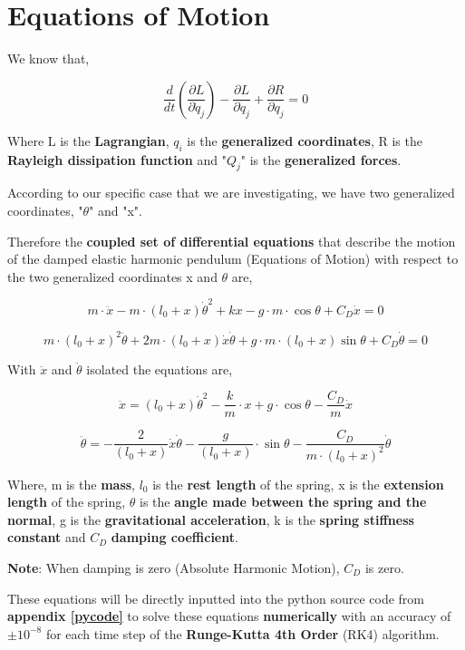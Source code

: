 
\section{{Equations of Motion}}
            
    {We know that,}
            
        $$\frac{d}{dt}\left(\frac{\partial L}{\partial \dot{q}_j}\right) - \frac{\partial L}{\partial q_j} + \frac{\partial R}{\partial q_j} = 0$$
            
    {Where L is the \textbf{Lagrangian}, $q_i$ is the \textbf{generalized coordinates}, R is the \textbf{Rayleigh dissipation function} and "$Q_j$" is the \textbf{generalized forces}.}
            
    {According to our specific case that we are investigating, we have two generalized coordinates, "$\theta$" and "x".}        
            
    {Therefore the \textbf{coupled set of differential equations} that describe the motion of the damped elastic harmonic pendulum (Equations of Motion) with respect to the two generalized coordinates x and $\theta$ are,}
            
        $$m\cdot\ddot{x} -m\cdot(l_0+x)\dot{\theta}^2 + kx - g\cdot m\cdot\cos{\theta} + C_D\dot{x} = 0$$
            
        $$m\cdot(l_0+x)^2\ddot{\theta} + 2m\cdot(l_0+x)\dot{x}\dot{\theta} + g\cdot m\cdot(l_0+x)\sin{\theta} + C_D\dot{\theta} = 0$$
            
    {With $\ddot{x}$ and $\ddot{\theta}$ isolated the equations are,}
            
        $$\ddot{x} = (l_0+x)\dot{\theta}^2 - \frac{k}{m}\cdot x + g\cdot\cos{\theta} - \frac{C_D}{m}\dot{x}$$
            
        $$\ddot{\theta} = - \frac{2}{(l_0+x)}\dot{x}\dot{\theta} - \frac{g}{(l_0+x)}\cdot\sin{\theta} - \frac{C_D}{m\cdot(l_0+x)^2}\dot{\theta}$$
            
    {Where, m is the \textbf{mass}, $l_0$ is the \textbf{rest length} of the spring, x is the \textbf{extension length} of the spring, $\theta$ is the \textbf{angle made between the spring and the normal}, g is the \textbf{gravitational acceleration}, k is the \textbf{spring stiffness constant} and $C_D$ \textbf{damping coefficient}.}
            
    {\textbf{Note}: When damping is zero (Absolute Harmonic Motion), $C_D$ is zero.}
            
    {These equations will be directly inputted into the python source code from \textbf{appendix \ref{pycode}} to solve these equations \textbf{numerically} with an accuracy of $\pm 10^{-8}$ for each time step of the \textbf{Runge-Kutta 4th Order} (RK4) algorithm.}
           
